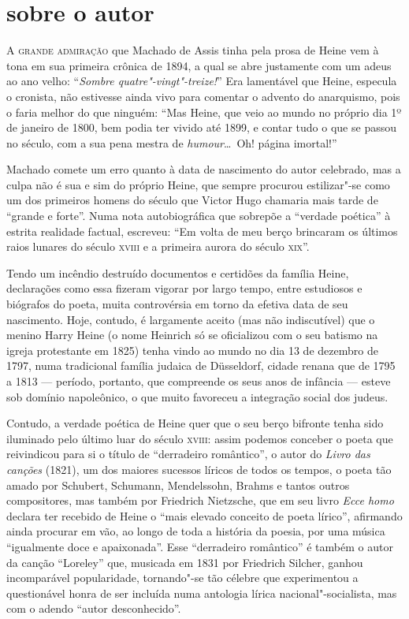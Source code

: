 

\section{sobre o autor}

\textsc{A grande admiração} que Machado de Assis tinha pela prosa de Heine vem à
tona em sua primeira crônica de 1894, a qual se abre justamente com um
adeus ao ano velho: “\textit{Sombre quatre"-vingt"-treize!}” Era
lamentável que Heine, especula o cronista, não estivesse ainda vivo
para comentar o advento do anarquismo, pois o faria melhor do que
ninguém: “Mas Heine, que veio ao mundo no próprio dia 1º de janeiro de
1800, bem podia ter vivido até 1899, e contar tudo o que se passou no
século, com a sua pena mestra de \textit{humour}\ldots\ Oh! página
imortal!”

Machado comete um erro quanto à data de nascimento do autor celebrado,
mas a culpa não é sua e sim do próprio Heine, que sempre procurou
estilizar"-se como um dos primeiros homens do século que Victor Hugo
chamaria mais tarde  de “grande e forte”. Numa nota autobiográfica que
sobrepõe a “verdade poética” à estrita realidade factual, escreveu: “Em
volta de meu berço brincaram os últimos raios lunares do século \textsc{xviii} e
a primeira aurora do século \textsc{xix}”.

Tendo um incêndio destruído documentos e certidões da família Heine,
declarações como essa fizeram vigorar por largo tempo, entre estudiosos
e biógrafos do poeta, muita controvérsia em torno da efetiva data de
seu nascimento. Hoje, contudo, é largamente aceito (mas não
indiscutível) que o menino Harry Heine (o nome Heinrich só se
oficializou com o seu batismo na igreja protestante em 1825) tenha
vindo ao mundo no dia 13 de dezembro de 1797, numa tradicional família
judaica de Düsseldorf, cidade renana que de 1795 a 1813 --- período,
portanto, que compreende os seus anos de infância --- esteve sob domínio
napoleônico, o que muito favoreceu a integração social dos judeus.

Contudo, a verdade poética de Heine quer que o seu berço bifronte tenha
sido iluminado pelo último luar do século \textsc{xviii}: assim podemos conceber
o poeta que reivindicou para si o título de “derradeiro romântico”, o
autor do \textit{Livro das canções} (1821), um dos maiores sucessos
líricos de todos os tempos, o poeta tão amado por Schubert, Schumann,
Mendelssohn, Brahms e tantos outros compositores, mas também por
Friedrich Nietzsche, que em seu livro \textit{Ecce homo} declara ter
recebido de Heine o “mais elevado conceito de poeta lírico”, afirmando
ainda procurar em vão, ao longo de toda a história da poesia, por uma
música “igualmente doce e apaixonada”. Esse “derradeiro romântico” é
também o autor da canção “Loreley” que, musicada em 1831 por Friedrich
Silcher, ganhou incomparável popularidade, tornando"-se tão célebre
que experimentou a questionável honra de ser incluída numa antologia
lírica nacional"-socialista, mas com o adendo “autor desconhecido”.

